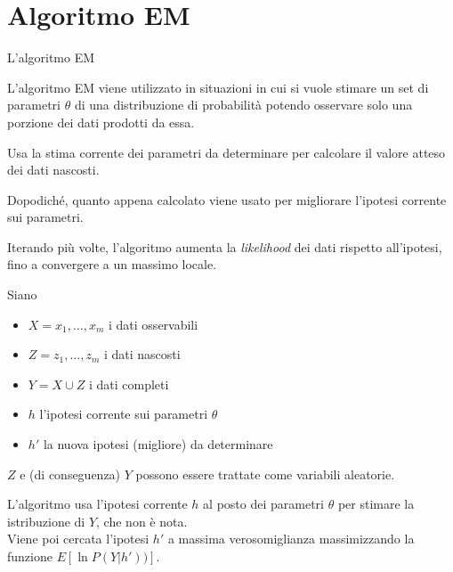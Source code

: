 \documentclass[hyperref={pdfpagelabels=false},slidestop,mathserif,red]{beamer}
\title[Elaborato di Apprendimento Automatico] %
{}
\subtitle
{Accelerometer Based Gesture Recognition using HMMs} %
\author[Andrea~Tarocchi, Marco~Magnatti] %
{Andrea~Tarocchi, Marco~Magnatti}
\date[Exam] %
{8 gennaio 2009}
\begin{document}
\section{Algoritmo EM}

\begin{frame}{L'algoritmo EM}{}

\begin{block}{}
L'algoritmo EM viene utilizzato in situazioni in cui si vuole stimare un set di parametri $\theta$ di una distribuzione di probabilit\`a potendo osservare solo una porzione dei dati prodotti da essa.
\end{block}

\begin{block}{}
 Usa la stima corrente dei parametri da determinare per calcolare il valore atteso dei dati nascosti.
\end{block}

\begin{block}{}
 Dopodich\'e, quanto appena calcolato viene usato per migliorare l'ipotesi corrente sui parametri.
\end{block}

\begin{block}{}
 Iterando pi\`u volte, l'algoritmo aumenta la \textit{likelihood} dei dati rispetto all'ipotesi, fino a convergere a un massimo locale.
\end{block}

\end{frame}

\begin{frame}{}

\begin{block}{}
 Siano
  \begin{itemize}
   \item $X = {x_{1}, \ldots, x_{m}}$ i dati osservabili
   \item $Z = {z_{1}, \ldots, z_{m}}$ i dati nascosti
   \item $Y = X \cup Z$ i dati completi
   \item $h$ l'ipotesi corrente sui parametri $\theta$
   \item $h'$ la nuova ipotesi (migliore) da determinare
  \end{itemize}
\end{block}

\begin{block}{}
 $Z$ e (di conseguenza) $Y$ possono essere trattate come variabili aleatorie.
\end{block}

\begin{block}{}
 L'algoritmo usa l'ipotesi corrente $h$ al posto dei parametri $\theta$ per stimare la istribuzione di $Y$, che non \`e nota.\\
 Viene poi cercata l'ipotesi $h'$ a massima verosomiglianza massimizzando la funzione $E[\ln P(Y | h'))]$.
\end{block}

\end{frame}
\end{document}
